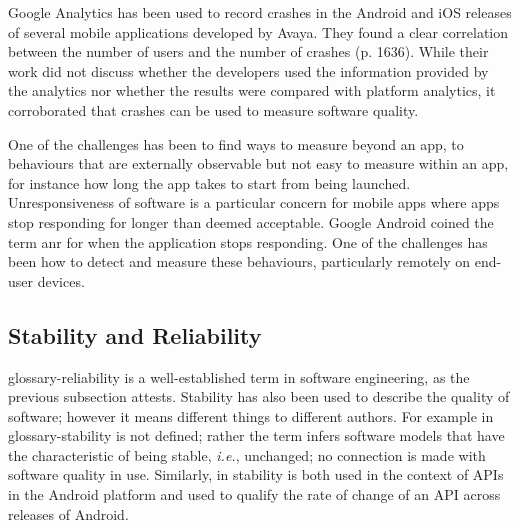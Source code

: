 Google Analytics has been used to record crashes in the Android and iOS releases of several mobile applications developed by Avaya. They found a clear correlation between the number of users and the number of crashes (p. 1636). While their work did not discuss whether the developers used the information provided by the analytics nor whether the results were compared with platform analytics, it corroborated that crashes can be used to measure software quality. 

One of the challenges has been to find ways to measure beyond an app, to behaviours that are externally observable but not easy to measure within an app, for instance how long the app takes to start from being launched. Unresponsiveness of software is a particular concern for mobile apps where apps stop responding for longer than deemed acceptable. Google Android coined the term \Gls{anr} for when the application stops responding. One of the challenges has been how to detect and measure these behaviours, particularly remotely on end-user devices. 


\subsection{Stability and Reliability}\label{rw-stability-and-reliability}
\Gls{glossary-reliability} is a well-established term in software engineering, as the previous subsection attests. Stability has also been used to describe the quality of software; however it means different things to different authors. For example in  \gls{glossary-stability} is not defined; rather the term infers software models that have the characteristic of being stable, \emph{i.e.}, unchanged; no connection is made with software quality in use. Similarly, in  stability is both used in the context of APIs in the Android platform and used to qualify the rate of change of an API across releases of Android.

